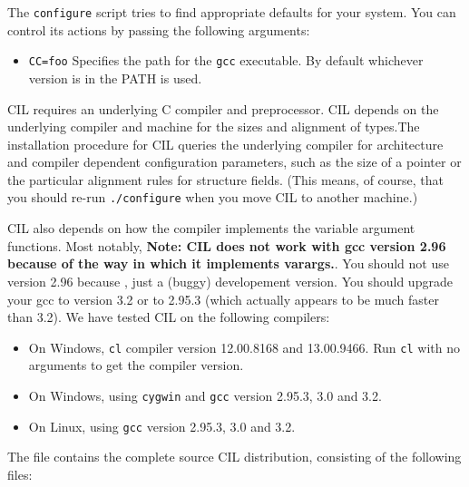 \documentclass{article}
\def\t#1{{\tt #1}}
\begin{document}
 The \t{configure} script tries to find appropriate defaults for your system.
You can control its actions by passing the following arguments:
\begin{itemize}
\item \t{CC=foo} Specifies the path for the \t{gcc} executable. By default
whichever version is in the PATH is used.
\end{itemize}

 CIL requires an underlying C compiler and preprocessor. CIL depends on the
underlying compiler and machine for the sizes and alignment of types.The
installation procedure for CIL queries the underlying compiler for
architecture and compiler dependent configuration parameters, such as the size
of a pointer or the particular alignment rules for structure fields. (This
means, of course, that you should re-run \t{./configure} when you move CIL to
another machine.)

 CIL also depends on how the compiler implements the variable argument
functions. Most notably, {\bf Note: CIL does not work with gcc version 2.96
because of the way in which it implements varargs.}. You should not use
version 2.96 because , just a (buggy) developement version. You should upgrade
your gcc to version 3.2 or to 2.95.3 (which actually appears to be much faster
than 3.2). We have tested CIL on the following compilers:

\begin{itemize}
\item On Windows, \t{cl} compiler version 12.00.8168 and 13.00.9466. 
Run \t{cl} with no arguments to get the compiler version. 
\item On Windows, using \t{cygwin} and \t{gcc} version 2.95.3, 3.0 and 3.2.
\item On Linux, using \t{gcc} version 2.95.3, 3.0 and 3.2.
\end{itemize}

The file  
contains the complete source CIL distribution, 
consisting of the following files:
\end{document}
